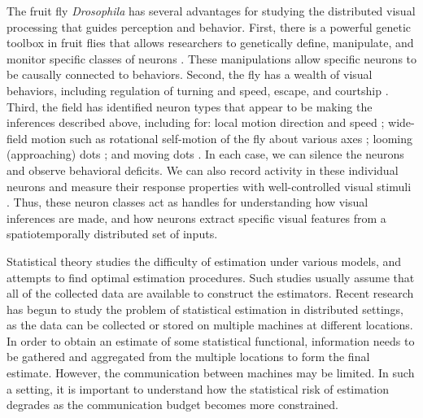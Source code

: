 The fruit fly \textit{Drosophila} has several advantages for studying the
distributed visual processing that guides perception and
behavior. First, there is a powerful genetic toolbox in fruit flies
that allows researchers to genetically define, manipulate, and monitor
specific classes of neurons \citep{luo:08}. These manipulations
allow specific neurons to be causally connected to
behaviors. Second, the fly has a wealth of visual behaviors,
including regulation of turning and speed, escape, and
courtship \citep{card:08,silies:14,spieth:74}.
Third, the field has identified neuron types that
appear to be making the inferences described above, including for: 
local motion direction and speed \citep{Maisak:13};
wide-field motion such as rotational
self-motion of the fly about various axes \citep{joesch:08};
looming (approaching) 
dots \citep{devries:12,klapoetke:17}; and 
moving dots \citep{keles:17}. In each case, we
can silence the neurons and observe behavioral deficits. We can also
record activity in these individual neurons and measure their
response properties with well-controlled visual stimuli
\citep{salazar:16}. Thus, these neuron classes act as
handles for understanding how visual inferences are made, and how
neurons extract specific visual features from a spatiotemporally
distributed set of inputs.


\statbackground{}
Statistical theory studies the difficulty of estimation under
various models, and attempts to find optimal estimation
procedures. Such studies usually assume that all of the collected
data are available to construct the estimators. Recent research
has begun to study the problem of statistical estimation in distributed settings, 
as the data can be collected or
stored on multiple machines at different locations. In order to obtain an estimate of some
statistical functional, information needs to be gathered and
aggregated from the multiple locations to form the final
estimate. However, the communication between machines may be
limited. In such a setting, it is important to understand how the
statistical risk of estimation degrades as the communication budget
becomes more constrained.

